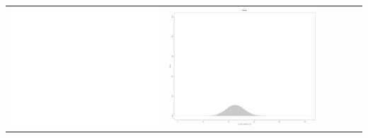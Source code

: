 \begin{table}[htbp]
{\begin{tabular}{l | ccccc}
\begin{minipage}{.15\textwidth}
     			 	\includegraphics[width=\linewidth]{images/mema-dens-graph/N5}
    				 \end{minipage}
    			   &	 \begin{minipage}{.15\textwidth}
     			 	\includegraphics[width=\linewidth]{images/mema-dens-graph/N9}
    				 \end{minipage}
    			   &	 \begin{minipage}{.15\textwidth}

\end{minipage}
\end{tabular}}
\end{table}
